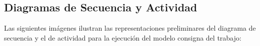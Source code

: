 \documentclass[10pt]{article} %
\begin{document}
\begin{figure}[H] %
\label{fig:CasoDeUso}
\end{figure}

\subsection{Diagramas de Secuencia y Actividad}
Las siguientes imágenes ilustran las representaciones preliminares del diagrama de secuencia y el de actividad para la ejecución del modelo consigna del trabajo:
\end{document}
